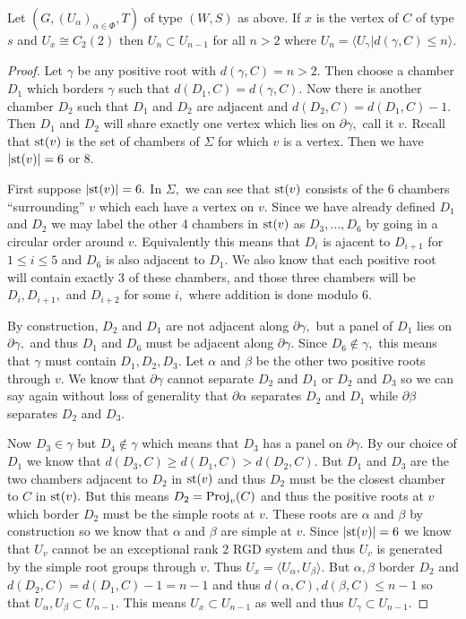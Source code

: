 \documentclass[class=book, crop=false]{standalone}
\begin{document}
\begin{theorem}
	\label{thm:334f2fg}
	Let $(G,(U_\alpha)_{\alpha\in \Phi},T)$ of type $(W,S)$ as above. If $x$ is the vertex of $C$ of type $s$ and $U_x\cong C_2(2)$ then $U_n\subset U_{n-1}$ for all $n>2$ where $U_n=\langle U_\gamma|d(\gamma,C)\le n\rangle.$
\end{theorem}
\begin{proof}
	Let $\gamma$ be any positive root with $d(\gamma,C)=n>2.$ Then choose a chamber $D_1$ which borders $\gamma$ such that $d(D_1,C)=d(\gamma,C).$ Now there is another chamber $D_2$ such that $D_1$ and $D_2$ are adjacent and $d(D_2,C)=d(D_1,C)-1.$ Then $D_1$ and $D_2$ will share exactly one vertex which lies on $\partial \gamma,$ call it $v.$ Recall that $\mathrm{st}(v)$ is the set of chambers of $\Sigma$ for which $v$ is a vertex. Then we have $|\mathrm{st}(v)|=6$ or $8.$

	First suppose $|\mathrm{st}(v)|=6.$ In $\Sigma,$ we can see that $\mathrm{st}(v)$ consists of the 6 chambers ``surrounding'' $v$ which each have a vertex on $v.$ Since we have already defined $D_1$ and $D_2$ we may label the other 4 chambers in $\mathrm{st}(v)$ as $D_3,\dots,D_6$ by going in a circular order around $v.$ Equivalently this means that $D_i$ is ajacent to $D_{i+1}$ for $1\le i\le 5$ and $D_6$ is also adjacent to $D_1.$ We also know that each positive root will contain exactly 3 of these chambers, and those three chambers will be $D_i,D_{i+1},$ and $D_{i+2}$ for some $i,$ where addition is done modulo 6.

	By construction, $D_2$ and $D_1$ are not adjacent along $\partial \gamma,$ but a panel of $D_1$ lies on $\partial \gamma,$ and thus $D_1$ and $D_6$ must be adjacent along $\partial\gamma.$ Since $D_6\not\in \gamma,$ this means that $\gamma$ must contain $D_1,D_2,D_3.$ Let $\alpha$ and $\beta$ be the other two positive roots through $v.$ We know that $\partial\gamma$ cannot separate $D_2$ and $D_1$ or $D_2$ and $D_3$ so we can say again without loss of generality that $\partial\alpha$ separates $D_2$ and $D_1$ while $\partial\beta$ separates $D_2$ and $D_3.$ 

	Now $D_3\in \gamma$ but $D_4\not\in \gamma$ which means that $D_3$ has a panel on $\partial\gamma.$ By our choice of $D_1$ we know that $d(D_3,C)\ge d(D_1,C)>d(D_2,C).$ But $D_1$ and $D_3$ are the two chambers adjacent to $D_2$ in $\mathrm{st}(v)$ and thus $D_2$ must be the closest chamber to $C$ in $\mathrm{st}(v).$ But this means $D_2=\mathrm{Proj}_v(C)$ and thus the positive roots at $v$ which border $D_2$ must be the simple roots at $v.$ These roots are $\alpha$ and $\beta$ by construction so we know that $\alpha$ and $\beta$ are simple at $v.$ Since $|\mathrm{st}(v)|=6$ we know that $U_v$ cannot be an exceptional rank 2 RGD system and thus $U_v$ is generated by the simple root groups through $v.$ Thus $U_x=\langle U_\alpha,U_\beta\rangle.$ But $\alpha,\beta$ border $D_2$ and $d(D_2,C)=d(D_1,C)-1=n-1$ and thus $d(\alpha,C),d(\beta,C)\le n-1$ so that $U_\alpha,U_\beta\subset U_{n-1}.$ This means $U_x\subset U_{n-1}$ as well and thus $U_\gamma \subset U_{n-1}.$
	

\end{proof}
\end{document}
